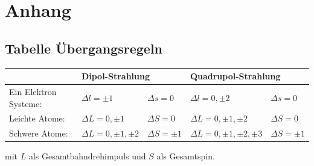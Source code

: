 \documentclass[twocolumn]{summery_4.1}
\begin{document}
\onecolumn
\section{Anhang}
\subsection*{Tabelle Übergangsregeln}
\begin{center}
    \begin{tabular}[H]{@{}lllll@{}}
        \toprule
        & \multicolumn{2}{l}{\bf Dipol-Strahlung} & \multicolumn{2}{l}{\bf Quadrupol-Strahlung}\\
        \midrule
        Ein Elektron Systeme: &\(\Delta l = \pm 1\)&\(\Delta s = 0 \) & \(\Delta l = 0,\pm 2\)&\(\Delta s = 0\)\\
        Leichte Atome: & \(\Delta L =0,\pm 1\)&\( \Delta S = 0\) & \(\Delta L = 0,\pm1, \pm2\)&\(\Delta S = 0 \)\\
        Schwere Atome: & \(\Delta L =0,\pm1,\pm2\)&\(\Delta S = \pm 1\) & \(\Delta L = 0, \pm1,\pm2,\pm3\)&\(\Delta S = \pm1 \)\\
        \bottomrule
    \end{tabular}
    \label{Übergangsregeln}
\end{center}
mit \(L\) als Gesamtbahndrehimpuls und \(S\) als Gesamtspin.
\end{document}
